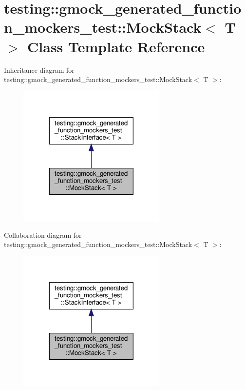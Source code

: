 \hypertarget{classtesting_1_1gmock__generated__function__mockers__test_1_1_mock_stack}{}\section{testing\+:\+:gmock\+\_\+generated\+\_\+function\+\_\+mockers\+\_\+test\+:\+:Mock\+Stack$<$ T $>$ Class Template Reference}
\label{classtesting_1_1gmock__generated__function__mockers__test_1_1_mock_stack}


Inheritance diagram for testing\+:\+:gmock\+\_\+generated\+\_\+function\+\_\+mockers\+\_\+test\+:\+:Mock\+Stack$<$ T $>$\+:
\nopagebreak
\begin{figure}[H]
\begin{center}
\leavevmode
\includegraphics[width=209pt]{classtesting_1_1gmock__generated__function__mockers__test_1_1_mock_stack__inherit__graph}
\end{center}
\end{figure}


Collaboration diagram for testing\+:\+:gmock\+\_\+generated\+\_\+function\+\_\+mockers\+\_\+test\+:\+:Mock\+Stack$<$ T $>$\+:
\nopagebreak
\begin{figure}[H]
\begin{center}
\leavevmode
\includegraphics[width=209pt]{classtesting_1_1gmock__generated__function__mockers__test_1_1_mock_stack__coll__graph}
\end{center}
\end{figure}
